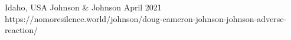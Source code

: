           {Idaho, USA}
          {}
          {Johnson \& Johnson}
          {April 2021}
          {
          }
          {https://nomoresilence.world/johnson/doug-cameron-johnson-johnson-adverse-reaction/}

